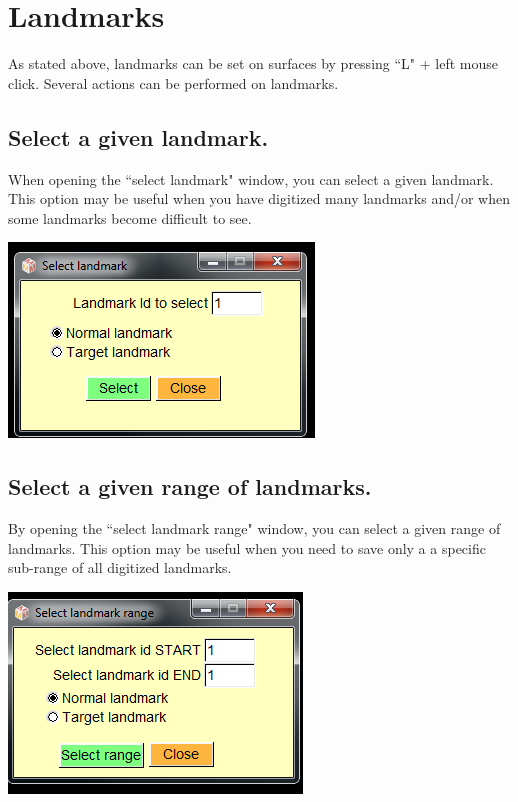 
\chapter{Landmarks}
\minitoc 


As stated above, landmarks can be set on surfaces by pressing ``L" + left mouse click. Several actions
can be performed on landmarks.

\section{Select a given landmark.}


\noindent
\begin{minipage}{0.5\textwidth}
When opening the ``select landmark" window, you can
select a given landmark. This option may be useful when
you have digitized many landmarks and/or when some
landmarks become difficult to see.
\end{minipage}    
\begin{minipage}{0.5\textwidth}\centering
  \includegraphics[scale=0.5]{images/Edit_selected_landmarks/Select_given_landmark.png}
 \end{minipage} 
\noindent

\section{Select a given range of landmarks.}
\noindent
\begin{minipage}{0.5\textwidth}
By opening the ``select landmark range" window, you can
select a given range of landmarks. This option may be useful
when you need to save only a a specific sub-range of all
digitized landmarks.
\end{minipage}    
\begin{minipage}{0.5\textwidth}\centering
  \includegraphics[scale=0.5]{images/Edit_selected_landmarks/Select_landmark_range.png}
 \end{minipage} 
\noindent




